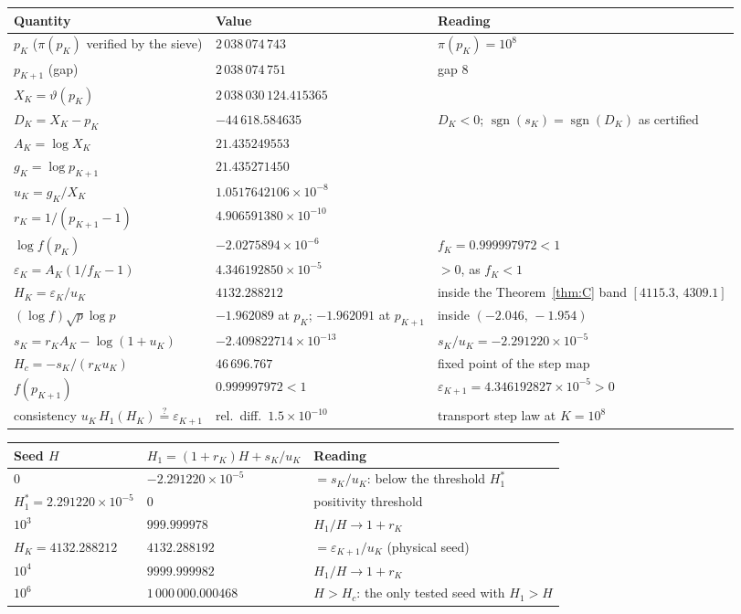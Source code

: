 \documentclass[11pt]{article}
\theoremstyle{remark}
\newcommand{\eps}{\varepsilon}
\DeclareMathOperator{\sgn}{sgn}
\begin{document}
\begin{center}
\begin{tabular}{@{}lll@{}}
\toprule
Quantity & Value & Reading \\
\midrule
$p_K$ ($\pi(p_K)$ verified by the sieve) & $2\,038\,074\,743$ & $\pi(p_K)=10^{8}$ \\
$p_{K+1}$ (gap) & $2\,038\,074\,751$ & gap $8$ \\
$X_K=\vartheta(p_K)$ & $2\,038\,030\,124.415365$ & \\
$D_K=X_K-p_K$ & $-44\,618.584635$ & $D_K<0$; $\sgn(s_K)=\sgn(D_K)$ as certified \\
$A_K=\log X_K$ & $21.435249553$ & \\
$g_K=\log p_{K+1}$ & $21.435271450$ & \\
$u_K=g_K/X_K$ & $1.0517642106\times10^{-8}$ & \\
$r_K=1/(p_{K+1}-1)$ & $4.906591380\times10^{-10}$ & \\
$\log f(p_K)$ & $-2.0275894\times10^{-6}$ & $f_K=0.999997972<1$ \\
$\eps_K=A_K(1/f_K-1)$ & $4.346192850\times10^{-5}$ & $>0$, as $f_K<1$ \\
$H_K=\eps_K/u_K$ & $4132.288212$ & inside the Theorem~\ref{thm:C} band $[4115.3,\,4309.1]$ \\
$(\log f)\sqrt{p}\log p$ & $-1.962089$ at $p_K$; $-1.962091$ at $p_{K+1}$ & inside $(-2.046,\,-1.954)$ \\
$s_K=r_KA_K-\log(1+u_K)$ & $-2.409822714\times10^{-13}$ & $s_K/u_K=-2.291220\times10^{-5}$ \\
$H_c=-s_K/(r_Ku_K)$ & $46\,696.767$ & fixed point of the step map \\
$f(p_{K+1})$ & $0.999997972<1$ & $\eps_{K+1}=4.346192827\times10^{-5}>0$ \\
consistency $u_K\,H_1(H_K)\stackrel{?}{=}\eps_{K+1}$ & rel.\ diff.\ $1.5\times10^{-10}$ & transport step law at $K=10^8$ \\
\bottomrule
\end{tabular}
\end{center}

\begin{center}
\begin{tabular}{@{}lll@{}}
\toprule
Seed $H$ & $H_1=(1+r_K)H+s_K/u_K$ & Reading \\
\midrule
$0$ & $-2.291220\times10^{-5}$ & $=s_K/u_K$: below the threshold $H_1^{*}$ \\
$H_1^{*}=2.291220\times10^{-5}$ & $0$ & positivity threshold \\
$10^{3}$ & $999.999978$ & $H_1/H\to1+r_K$ \\
$H_K=4132.288212$ & $4132.288192$ & $=\eps_{K+1}/u_K$ (physical seed) \\
$10^{4}$ & $9999.999982$ & $H_1/H\to1+r_K$ \\
$10^{6}$ & $1\,000\,000.000468$ & $H>H_c$: the only tested seed with $H_1>H$ \\
\bottomrule
\end{tabular}
\end{center}
\end{document}
